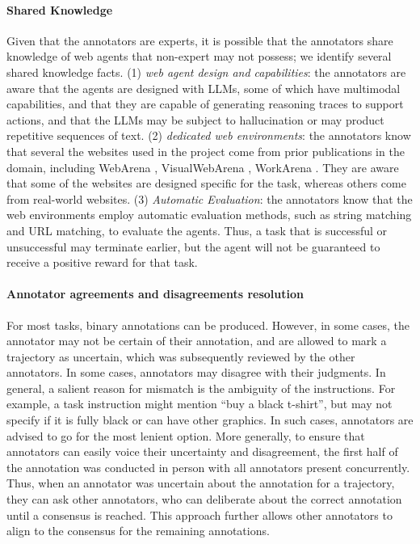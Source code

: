 \documentclass{article} %
\begin{document}
\paragraph{Shared Knowledge}
Given that the annotators are experts, it is possible that the annotators share knowledge of web agents that non-expert may not possess; we identify several  shared knowledge facts. (1) \textit{web agent design and capabilities}: the annotators are aware that the agents are designed with LLMs, some of which have multimodal capabilities, and that they are capable of generating reasoning traces to support actions, and that the LLMs may be subject to hallucination or may product repetitive sequences of text. (2) \textit{dedicated web environments}: the annotators know that several the websites used in the project come from prior publications in the domain, including WebArena \citep{zhou_webarena_2024}, VisualWebArena \citep{koh_visualwebarena_2024}, WorkArena \citep{workarena_l1,workarena_l2}. They are aware that some of the websites are designed specific for the task, whereas others come from real-world websites. (3) \textit{Automatic Evaluation}: the annotators know that the web environments employ automatic evaluation methods, such as string matching and URL matching, to evaluate the agents. Thus, a task that is successful or unsuccessful may terminate earlier, but the agent will not be guaranteed to receive a positive reward for that task. 

\paragraph{Annotator agreements and disagreements resolution}
For most tasks, binary annotations can be produced. However, in some cases, the annotator may not be certain of their annotation, and are allowed to mark a trajectory as uncertain, which was subsequently reviewed by the other annotators. In some cases, annotators may disagree with their judgments. In general, a salient reason for mismatch is the ambiguity of the instructions. For example, a task instruction might mention “buy a black t-shirt”, but may not specify if it is fully black or can have other graphics. In such cases, annotators are advised to go for the most lenient option. More generally, to ensure that annotators can easily voice their uncertainty and disagreement, the first half of the annotation was conducted in person with all annotators present concurrently. Thus, when an annotator was uncertain about the annotation for a trajectory, they can ask other annotators, who can deliberate about the correct annotation until a consensus is reached. This approach further allows other annotators to align to the consensus for the remaining annotations. 
\end{document}
